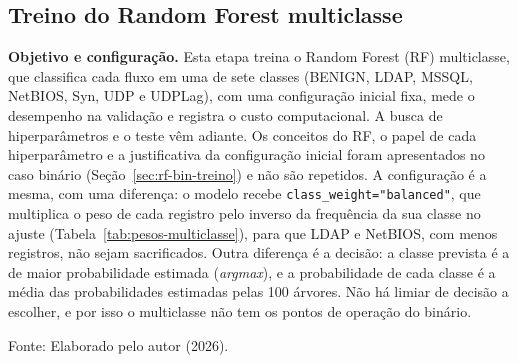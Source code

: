 \documentclass[
    12pt,                %
    openright,           %
    oneside,             %
    a4paper,             %
    english,             %
    brazil               %
]{abntex2}
\begin{document}
\subsection{Treino do Random Forest multiclasse}
\label{sec:rf-multi-treino}
 
\textbf{Objetivo e configuração.} Esta etapa treina o Random Forest (RF) multiclasse, que classifica cada fluxo em uma de sete classes (BENIGN, LDAP, MSSQL, NetBIOS, Syn, UDP e UDPLag), com uma configuração inicial fixa, mede o desempenho na validação e registra o custo computacional. A busca de hiperparâmetros e o teste vêm adiante. Os conceitos do RF, o papel de cada hiperparâmetro e a justificativa da configuração inicial foram apresentados no caso binário (Seção~\ref{sec:rf-bin-treino}) e não são repetidos. A configuração é a mesma, com uma diferença: o modelo recebe \texttt{class\_weight="balanced"}, que multiplica o peso de cada registro pelo inverso da frequência da sua classe no ajuste (Tabela~\ref{tab:pesos-multiclasse}), para que LDAP e NetBIOS, com menos registros, não sejam sacrificados. Outra diferença é a decisão: a classe prevista é a de maior probabilidade estimada (\textit{argmax}), e a probabilidade de cada classe é a média das probabilidades estimadas pelas 100 árvores. Não há limiar de decisão a escolher, e por isso o multiclasse não tem os pontos de operação do binário.
 
\begin{table}
\centering
\caption{Configuração inicial do Random Forest multiclasse}
\label{tab:rf-multi-config-inicial}
\par\smallskip
Fonte: Elaborado pelo autor (2026).
\end{table}
 
\end{document}
